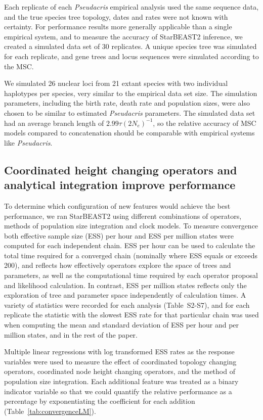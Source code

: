 \documentclass[nogrid]{MBE}%
\begin{document}
Each replicate of each \textit{Pseudacris} empirical analysis used the same
sequence data, and the true species tree topology, dates and rates were not
known with certainty. For performance results more generally applicable than a
single empirical system, and to measure the accuracy of StarBEAST2 inference,
we created a simulated data set of 30 replicates. A unique species tree was
simulated for each replicate, and gene trees and locus sequences were
simulated according to the MSC.

We simulated 26 nuclear loci from 21 extant species with two individual
haplotypes per species, very similar to the empirical data set size. The
simulation parameters, including the birth rate, death rate and population
sizes, were also chosen to be similar to estimated \textit{Pseudacris}
parameters. The simulated data set had an average branch length of
$2.99\tau(2N_e)^{-1}$, so the relative accuracy of MSC models compared
to concatenation should be comparable with empirical systems like
\textit{Pseudacris}.

\subsection{Coordinated height changing operators and analytical integration improve performance}

To determine which configuration of new features would achieve the best
performance, we ran StarBEAST2 using different combinations of operators,
methods of population size integration and clock models. To measure
convergence both effective sample size (ESS) per hour and ESS per million
states were computed for each independent chain. ESS per hour can be used to
calculate the total time required for a converged chain (nominally where ESS
equals or exceeds 200), and reflects how effectively operators explore the
space of trees and parameters, as well as the computational time required by
each operator proposal and likelihood calculation. In contrast, ESS per
million states reflects only the exploration of tree and parameter space
independently of calculation times. A variety of statistics were recorded for
each analysis (Table~S2-S7), and for each replicate the statistic with the
slowest ESS rate for that particular chain was used when computing the mean
and standard deviation of ESS per hour and per million states, and in the
rest of the paper.

Multiple linear regressions with log transformed ESS rates as the response
variables were used to measure the effect of coordinated topology changing
operators, coordinated node height changing operators, and the method of
population size integration. Each additional feature was treated as a binary
indicator variable so that we could quantify the relative performance as a
percentage by exponentiating the coefficient for each addition
(Table~\ref{tab:convergenceLM}).
\end{document}
